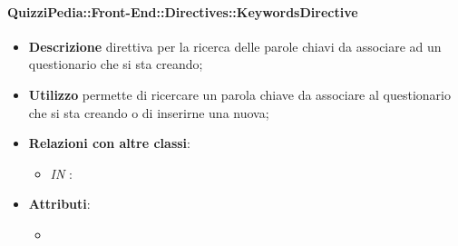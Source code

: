 \paragraph{QuizziPedia::Front-End::Directives::KeywordsDirective}
\begin{itemize}
	\item \textbf{Descrizione} direttiva per la ricerca delle parole chiavi da associare ad un questionario che si sta creando;
	\item \textbf{Utilizzo} permette di ricercare un parola chiave da associare al questionario che si sta creando o di inserirne una nuova; 
	\item \textbf{Relazioni con altre classi}:
	\begin{itemize}
		\item \textit{IN} \texttt{}: 
	\end{itemize}
	\item \textbf{Attributi}:
	\begin{itemize}
		\item
	\end{itemize}
\end{itemize}